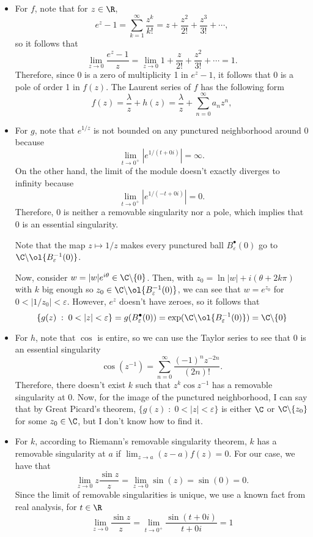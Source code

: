 \begin{itemize}
    \item For $f$, note that for $z \in \R$, 
    \[ e^z-1 = \sum_{k = 1}^{\infty} \frac{z^k}{k!} = z + \frac{z^2}{2!} + \frac{z^3}{3!} + \cdots, \]
    so it follows that
    \[ \lim_{z \to 0} \frac{e^z-1}{z} = \lim_{z\to 0} 1 + \frac{z}{2!} + \frac{z^2}{3!} + \cdots = 1.\]
    Therefore, since $0$ is a zero of multiplicity 1 in $e^{z}-1$, it follows that $0$ is a pole of order 1 in $f(z)$. The Laurent series of $f$ has the following form
    \[ f(z) = \frac{\lambda}{z} + h(z) = \frac{\lambda}{z} + \sum_{n = 0}^{\infty} a_n z^n, \]

    \item For $g$, note that $e^{1/z}$ is not bounded on any punctured neighborhood around 0 because
    \[ \lim_{t \to 0^+} |e^{1/(t+0i)}| = \infty. \]
    On the other hand, the limit of the module doesn't exactly diverges to infinity because
    \[ \lim_{t \to 0^+} |e^{1/(-t+0i)}| = 0. \]
    Therefore, $0$ is neither a removable singularity nor a pole, which implies that $0$ is an essential singularity. 
    
    Note that the map $z \mapsto 1/z$ makes every punctured ball $B^\bullet_\varepsilon(0)$ go to $\C \backslash \ol{B_\varepsilon^{-1}(0)}$. 
    
    Now, consider $w = |w|e^{i\theta} \in \C\backslash\{0\}$. Then, with $z_0 = \ln|w| + i(\theta +2k\pi)$ with $k$ big enough so $z_0 \in \C \backslash \ol{B_\varepsilon^{-1}(0)}$, we can see that $w = e^{z_0}$ for $0< |1/z_0|< \varepsilon$. However, $e^z$ doesn't have zeroes, so it follows that
    \[ \{g(z) \;:\; 0 < |z| < \varepsilon\} = g(B^\bullet_\varepsilon(0)) = \exp(\C \backslash \ol{B_\varepsilon^{-1}(0)}) = \C\backslash \{0\}\]

    \item For $h$, note that $\cos$ is entire, so we can use the Taylor series to see that $0$ is an essential singularity
    \[ \cos( z^{-1}) = \sum_{n = 0}^{\infty} \frac{(-1)^n z^{-2n}}{(2n)!}.\]
    Therefore, there doesn't exist $k$ such that $z^k \cos z^{-1}$ has a removable singularity at $0$. Now, for the image of the punctured neighborhood, I can say that by Great Picard's theorem, $\{g(z) \;:\; 0 < |z| < \varepsilon\}$ is either $\C$ or $\C \backslash \{z_0\}$ for some $z_0 \in \C$, but I don't know how to find it.  
    \item For $k$, according to Riemann's removable singularity theorem, $k$ has a removable singularity at $a$ if $\lim_{z\to a} (z-a) f(z) = 0$. For our case, we have that
    \[ \lim_{z\to 0}z\frac{\sin z}{z} = \lim_{z\to 0} \sin(z) = \sin(0) = 0. \]
    Since the limit of removable singularities is unique, we use a known fact from real analysis, for $t \in \R$
    \[ \lim_{z\to 0}\frac{\sin z}{z} = \lim_{t\to 0^+}\frac{\sin (t+0i)}{t+0i} = 1  \]
\end{itemize}